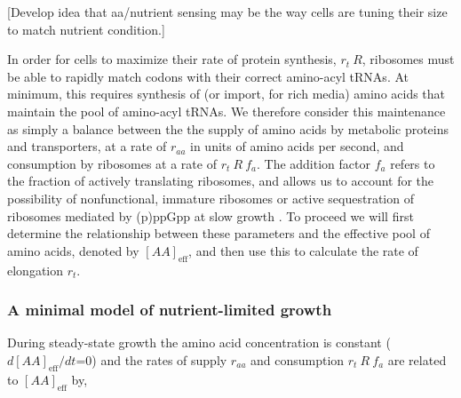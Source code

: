 
[Develop idea that aa/nutrient sensing may be the way cells are tuning their size to
match nutrient condition.]

In order for cells to maximize their rate of protein synthesis, $r_t \ R$,
ribosomes must be able to rapidly match codons with their correct amino-acyl
tRNAs. At minimum, this requires synthesis of (or import, for rich media) amino
acids that maintain the pool of amino-acyl tRNAs. We therefore consider this
maintenance as simply a balance between the the supply of amino acids by
metabolic proteins and transporters, at a rate of $r_{aa}$ in units of amino
acids per second, and consumption by ribosomes at a rate of $r_t \ R \ f_a$. The
addition factor $f_a$ refers to the fraction of actively translating ribosomes,
and allows us to account for the possibility of nonfunctional, immature
ribosomes or active sequestration of ribosomes mediated by (p)ppGpp at slow
growth \citep{dennis2004, dai2016}. To proceed we will first determine the
relationship between these parameters and the effective pool of amino acids,
denoted by $[AA]_{\text{eff}}$, and then use this to calculate the rate of
elongation $r_t$.

\subsubsection{A minimal model of nutrient-limited growth}

During steady-state
growth the amino acid concentration is constant ($d[AA]_{\text{eff}}/dt$=0) and the rates of supply
$r_{aa}$ and consumption $r_t \ R \ f_a$ are related to $[AA]_{\text{eff}}$ by,

